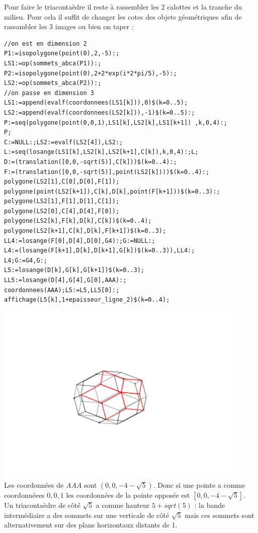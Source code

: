 \documentclass[a4paper,11pt]{book}
\begin{document}
Pour faire le triaconta\`edre il reste \`a rassembler 
les 2 calottes et la tranche du milieu. Pour cela il suffit  de changer les 
cotes des objets g\'eom\'etriques afin de rassambler les 3 images ou bien on
taper :
\begin{verbatim}
//on est en dimension 2
P1:=isopolygone(point(0),2,-5):;
LS1:=op(sommets_abca(P1)):;
P2:=isopolygone(point(0),2+2*exp(i*2*pi/5),-5):;
LS2:=op(sommets_abca(P2)):;
//on passe en dimension 3
LS1:=append(evalf(coordonnees(LS1[k])),0)$(k=0..5);
LS2:=append(evalf(coordonnees(LS2[k])),-1)$(k=0..5):;
P:=seq(polygone(point(0,0,1),LS1[k],LS2[k],LS1[k+1]) ,k,0,4):;
P;
C:=NULL:;LS2:=evalf(LS2[4]),LS2:;
L:=seq(losange(LS1[k],LS2[k],LS2[k+1],C[k]),k,0,4):;L;
D:=(translation([0,0,-sqrt(5)],C[k]))$(k=0..4):;
F:=(translation([0,0,-sqrt(5)],point(LS2[k])))$(k=0..4):;
polygone(LS2[1],C[0],D[0],F[1]);
polygone(point(LS2[k+1]),C[k],D[k],point(F[k+1]))$(k=0..3):;
polygone(LS2[1],F[1],D[1],C[1]);
polygone(LS2[0],C[4],D[4],F[0]);
polygone(LS2[k],F[k],D[k],C[k])$(k=0..4);
polygone(LS2[k+1],C[k],D[k],F[k+1])$(k=0..3);
LL4:=losange(F[0],D[4],D[0],G4):;G:=NULL:;
L4:=(losange(F[k+1],D[k],D[k+1],G[k])$(k=0..3)),LL4:;
L4;G:=G4,G:;  
L5:=losange(D[k],G[k],G[k+1])$(k=0..3);
LL5:=losange(D[4],G[4],G[0],AAA):;
coordonnees(AAA);L5:=L5,LL5[0]:;
affichage(L5[k],1+epaisseur_ligne_2)$(k=0..4);
\end{verbatim}
\includegraphics[width=12cm]{triacon4}\\
Les coordonn\'ees de $AAA$ sont $(0,0,-4-\sqrt 5)$. Donc si une pointe a comme 
coordonn\'eees $0,0,1$ les coordonn\'ees de la pointe 
oppos\'ee est $[0,0,-4-\sqrt5]$.\\
Un triaconta\`edre de c\^ot\'e $\sqrt 5$ a comme hauteur $5+sqrt(5)$ : la bande 
interm\'ediaire a des sommets sur une verticale de c\^ot\'e  $\sqrt 5$ mais ces 
sommets sont alternativement sur des  plans horizontaux distants de 1.
\end{document}
